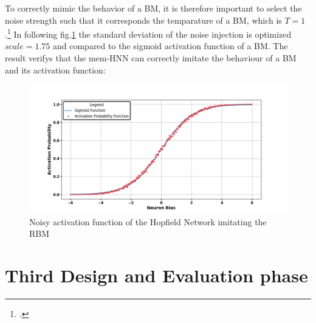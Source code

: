 To correctly mimic the behavior of a \ac{BM}, it is therefore important to select the noise strength such that it corresponds the temparature of a BM, which is \(T=1\).\footcite[cf.][3]{hintonBoltzmannMachines2014}
In following fig.\ref{Noisy_acitivation_function_good} the standard deviation of the noise injection is optimized \(scale=1.75\) and compared to the sigmoid activation function of a \ac{BM}.
The result verifys that the \ac{mem-HNN} can correctly imitate the behaviour of a \ac{BM} and its activation function:
\begin{figure}[H]
    \centering
    \includegraphics[width=1\linewidth]{graphics/Noisy_HNN_2.png}
    \caption{Noisy activation function of the Hopfield Network imitating the \ac{RBM}}
    \label{Noisy_acitivation_function_good}
\end{figure}
\section{Third Design and Evaluation phase}

